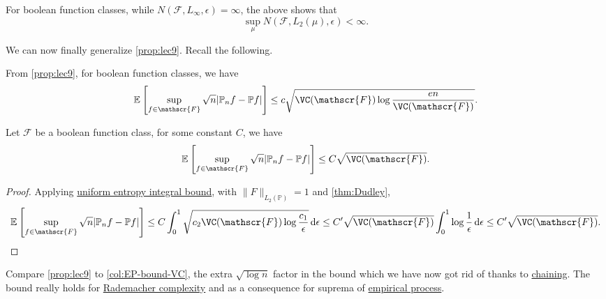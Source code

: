 \begin{remark}
	For boolean function classes, while \(N(\mathscr{F} , L_\infty , \epsilon ) = \infty \), the above shows that
	\[
		\sup _\mu N(\mathscr{F} , L_2(\mu ), \epsilon ) < \infty .
	\]
\end{remark}

We can now finally generalize \autoref{prop:lec9}. Recall the following.

\begin{prev}
	From \autoref{prop:lec9}, for boolean function classes, we have
	\[
		\mathbb{E}_{}\left[\sup _{f\in \mathscr{F} } \sqrt{n} \vert \mathbb{P} _n f - \mathbb{P} f \vert  \right]
		\leq c \sqrt{\VC(\mathscr{F} )\log \frac{en}{\VC(\mathscr{F} )}} .
	\]
\end{prev}

\begin{corollary}\label{col:EP-bound-VC}
	Let \(\mathscr{F} \) be a boolean function class, for some constant \(C\), we have
	\[
		\mathbb{E}_{}\left[\sup _{f\in \mathscr{F} } \sqrt{n} \vert \mathbb{P} _n f - \mathbb{P} f \vert \right]
		\leq C \sqrt{\VC(\mathscr{F} )} .
	\]
\end{corollary}
\begin{proof}
	Applying \hyperref[thm:uniform-entropy-integral-bound]{uniform entropy integral bound}, with \(\lVert F \rVert _{L_2(\mathbb{P} )} = 1\) and \autoref{thm:Dudley},
	\[
		\mathbb{E}_{}\left[\sup _{f\in \mathscr{F} } \sqrt{n} \vert \mathbb{P} _n f - \mathbb{P} f \vert \right]
		\leq C \int_{0}^{1} \sqrt{c_2 \VC(\mathscr{F} ) \log \frac{c_1}{\epsilon }}  \,\mathrm{d}\epsilon
		\leq C^{\prime} \sqrt{\VC(\mathscr{F} )} \int_{0}^{1} \log \frac{1}{\epsilon } \,\mathrm{d}\epsilon
		\leq C^{\prime} \sqrt{\VC(\mathscr{F} )} .
	\]
\end{proof}

\begin{remark}
	Compare \autoref{prop:lec9} to \autoref{col:EP-bound-VC}, the extra \(\sqrt{\log n}\) factor in the bound which we have now got rid of thanks to \hyperref[note:chaining]{chaining}. The bound really holds for \hyperref[def:Rademacher-complexity]{Rademacher complexity} and as a consequence for suprema of \hyperref[def:EP]{empirical process}.
\end{remark}

